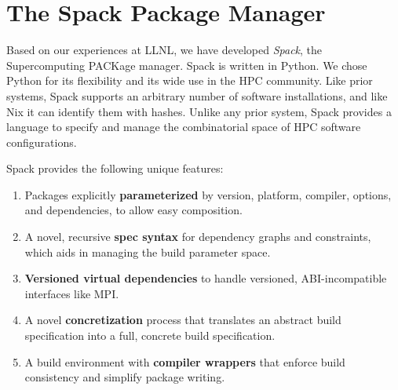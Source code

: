 
\section{The Spack Package Manager}
\label{sec:implementation}
Based on our experiences at LLNL, we have developed
{\it Spack}, the Supercomputing PACKage manager.
Spack is written in Python.  We chose Python for its flexibility
and its wide use in the HPC community.
%
Like prior systems, Spack supports an arbitrary number of software
installations, and like Nix it can identify them with hashes.  Unlike any
prior system, Spack provides a language to specify and manage the
combinatorial space of HPC software configurations.

\noindent
Spack provides the following unique features:
\begin{enumerate}
\item Packages explicitly {\bf parameterized} by version, platform,
      compiler, options, and dependencies, to allow easy composition.
\item A novel, recursive {\bf spec syntax} for dependency graphs and constraints,
      which aids in managing the build parameter space.
\item {\bf Versioned virtual dependencies} to handle versioned, 
      ABI-incompatible interfaces like MPI.
\item A novel {\bf concretization} process that translates an abstract build
      specification into a full, concrete build specification.
\item A build environment with {\bf compiler wrappers} that enforce build
      consistency and simplify package writing.
\end{enumerate}







